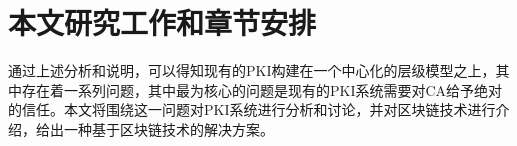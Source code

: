 














\section{本文研究工作和章节安排}


通过上述分析和说明，可以得知现有的PKI构建在一个中心化的层级模型之上，其中存在着一系列问题，其中最为核心的问题是现有的PKI系统需要对CA给予绝对的信任。本文将围绕这一问题对PKI系统进行分析和讨论，并对区块链技术进行介绍，给出一种基于区块链技术的解决方案。

